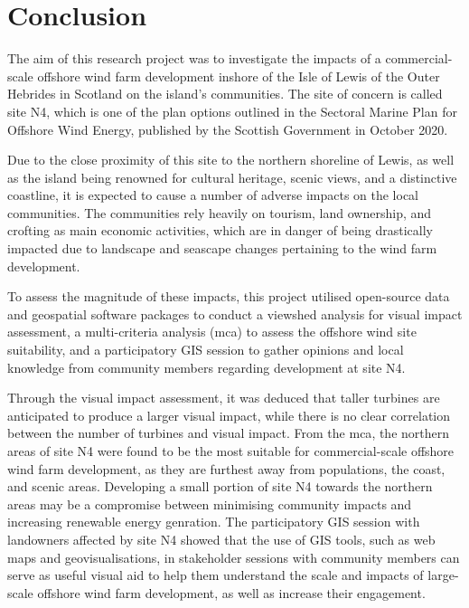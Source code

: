 \chapter{Conclusion}

The aim of this research project was to investigate the impacts of a commercial-scale offshore wind farm development inshore of the Isle of Lewis of the Outer Hebrides in Scotland on the island's communities. The site of concern is called site N4, which is one of the plan options outlined in the Sectoral Marine Plan for Offshore Wind Energy, published by the Scottish Government in October 2020.

Due to the close proximity of this site to the northern shoreline of Lewis, as well as the island being renowned for cultural heritage, scenic views, and a distinctive coastline, it is expected to cause a number of adverse impacts on the local communities. The communities rely heavily on tourism, land ownership, and crofting as main economic activities, which are in danger of being drastically impacted due to landscape and seascape changes pertaining to the wind farm development.

To assess the magnitude of these impacts, this project utilised open-source data and geospatial software packages to conduct a viewshed analysis for visual impact assessment, a multi-criteria analysis (\gls{mca}) to assess the offshore wind site suitability, and a participatory GIS session to gather opinions and local knowledge from community members regarding development at site N4.

Through the visual impact assessment, it was deduced that taller turbines are anticipated to produce a larger visual impact, while there is no clear correlation between the number of turbines and visual impact. From the \gls{mca}, the northern areas of site N4 were found to be the most suitable for commercial-scale offshore wind farm development, as they are furthest away from populations, the coast, and scenic areas. Developing a small portion of site N4 towards the northern areas may be a compromise between minimising community impacts and increasing renewable energy genration. The participatory GIS session with landowners affected by site N4 showed that the use of GIS tools, such as web maps and geovisualisations, in stakeholder sessions with community members can serve as useful visual aid to help them understand the scale and impacts of large-scale offshore wind farm development, as well as increase their engagement.
